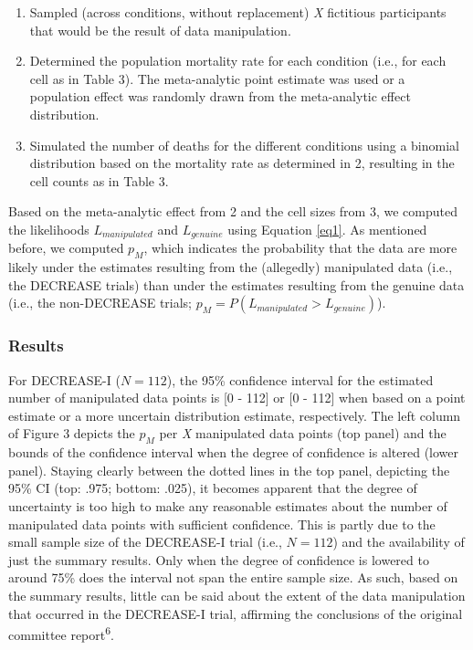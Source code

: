 \documentclass[]{article}
\begin{document}
\begin{enumerate}
\def\labelenumi{\arabic{enumi}.}
\item
  Sampled (across conditions, without replacement) \emph{X} fictitious
  participants that would be the result of data manipulation.
\item
  Determined the population mortality rate for each condition (i.e., for
  each cell as in Table 3). The meta-analytic point estimate was used or
  a population effect was randomly drawn from the meta-analytic effect
  distribution.
\item
  Simulated the number of deaths for the different conditions using a
  binomial distribution based on the mortality rate as determined in 2,
  resulting in the cell counts as in Table 3.
\end{enumerate}

Based on the meta-analytic effect from 2 and the cell sizes from 3, we
computed the likelihoods \(L_{manipulated}\) and \(L_{genuine}\) using
Equation \ref{eq1}. As mentioned before, we computed \(p_M\), which
indicates the probability that the data are more likely under the
estimates resulting from the (allegedly) manipulated data (i.e., the
DECREASE trials) than under the estimates resulting from the genuine
data (i.e., the non-DECREASE trials;
\(p_M=P(L_{manipulated}>L_{genuine})\)).

\subsubsection{Results}\label{results-2}

For DECREASE-I (\(N=112\)), the 95\% confidence interval for the
estimated number of manipulated data points is {[}0 - 112{]} or {[}0 -
112{]} when based on a point estimate or a more uncertain distribution
estimate, respectively. The left column of Figure 3 depicts the \(p_M\)
per \emph{X} manipulated data points (top panel) and the bounds of the
confidence interval when the degree of confidence is altered (lower
panel). Staying clearly between the dotted lines in the top panel,
depicting the 95\% CI (top: .975; bottom: .025), it becomes apparent
that the degree of uncertainty is too high to make any reasonable
estimates about the number of manipulated data points with sufficient
confidence. This is partly due to the small sample size of the
DECREASE-I trial (i.e., \(N=112\)) and the availability of just the
summary results. Only when the degree of confidence is lowered to around
75\% does the interval not span the entire sample size. As such, based
on the summary results, little can be said about the extent of the data
manipulation that occurred in the DECREASE-I trial, affirming the
conclusions of the original committee report\textsuperscript{6}.
\end{document}

